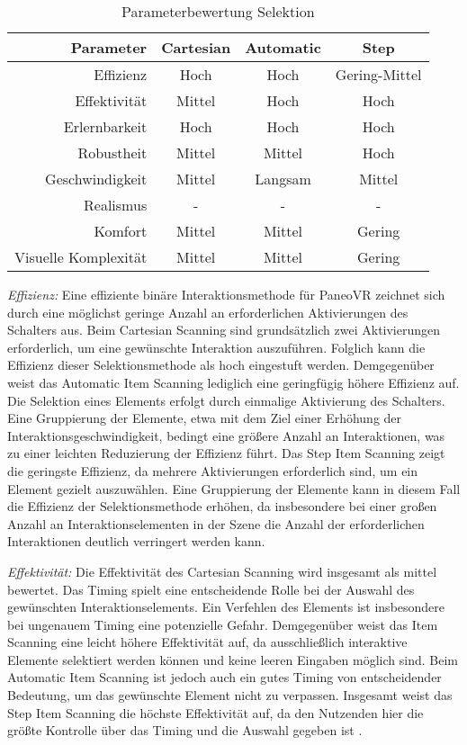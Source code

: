 \begin{table}[ht]
 \centering
 \begin{tabular}{r|c|c|c}
 Parameter & Cartesian & Automatic & Step \\
 \hline
 Effizienz & Hoch & Hoch & Gering-Mittel\\
 Effektivität & Mittel & Hoch & Hoch\\
 Erlernbarkeit & Hoch & Hoch & Hoch\\
 Robustheit & Mittel & Mittel & Hoch\\
 Geschwindigkeit & Mittel & Langsam & Mittel\\
 Realismus & - & - & - \\
 Komfort & Mittel & Mittel & Gering \\
 Visuelle Komplexität & Mittel & Mittel & Gering
 \end{tabular}
 \caption{Parameterbewertung Selektion}
 \label{tab:Selektion}
\end{table}

\textit{Effizienz:}
Eine effiziente binäre Interaktionsmethode für PaneoVR zeichnet sich durch eine möglichst geringe Anzahl an erforderlichen Aktivierungen des Schalters aus. Beim Cartesian Scanning sind grundsätzlich zwei Aktivierungen erforderlich, um eine gewünschte Interaktion auszuführen. Folglich kann die Effizienz dieser Selektionsmethode als hoch eingestuft werden. Demgegenüber weist das Automatic Item Scanning lediglich eine geringfügig höhere Effizienz auf. Die Selektion eines Elements erfolgt durch einmalige Aktivierung des Schalters. Eine Gruppierung der Elemente, etwa mit dem Ziel einer Erhöhung der Interaktionsgeschwindigkeit, bedingt eine größere Anzahl an Interaktionen, was zu einer leichten Reduzierung der Effizienz führt. Das Step Item Scanning zeigt die geringste Effizienz, da mehrere Aktivierungen erforderlich sind, um ein Element gezielt auszuwählen. Eine Gruppierung der Elemente kann in diesem Fall die Effizienz der Selektionsmethode erhöhen, da insbesondere bei einer großen Anzahl an Interaktionselementen in der Szene die Anzahl der erforderlichen Interaktionen deutlich verringert werden kann.

\textit{Effektivität:}
Die Effektivität des Cartesian Scanning wird insgesamt als mittel bewertet. Das Timing spielt eine entscheidende Rolle bei der Auswahl des gewünschten Interaktionselements. Ein Verfehlen des Elements ist insbesondere bei ungenauem Timing eine potenzielle Gefahr. Demgegenüber weist das Item Scanning eine leicht höhere Effektivität auf, da ausschließlich interaktive Elemente selektiert werden können und keine leeren Eingaben möglich sind. Beim Automatic Item Scanning ist jedoch auch ein gutes Timing von entscheidender Bedeutung, um das gewünschte Element nicht zu verpassen. Insgesamt weist das Step Item Scanning die höchste Effektivität auf, da den Nutzenden hier die größte Kontrolle über das Timing und die Auswahl gegeben ist \citep{cook_chapter_2015}.

